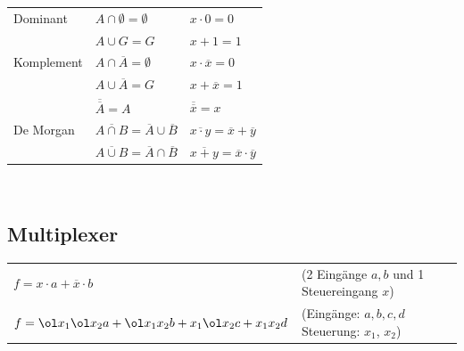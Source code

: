 \documentclass[6pt,a4paper]{scrartcl}
\begin{document}
\begin{multicols}{3}
\begin{tabular}{l|l|l}
		Dominant		& $A \cap \emptyset = \emptyset$ & $x \cdot 0 = 0$ \\
						& $A \cup G = G$ & $x + 1 = 1$ \\
		Komplement		& $A \cap \overline{A} = \emptyset$ & $x \cdot \overline{x} = 0$\\
						& $A \cup \overline{A} = G$ & $x + \overline{x} = 1$\\
						& $\overline{\overline{A}} = A$ & $\overline{\overline{x}} = x$\\
		De Morgan		& $\overline{A \cap B} = \overline{A} \cup \overline{B}$ & $\overline{x \cdot y} = \overline{x} + \overline{y}$\\
						& $\overline{A \cup B} = \overline{A} \cap \overline{B}$ & $\overline{x + y} = \overline{x} \cdot \overline{y}$\\

	\end{tabular}
	\\
	
	
	\subsection{Multiplexer}
	\begin{tabular}{ll}
		$f = x \cdot a + \overline x \cdot b$ & (2 Eingänge $a,b$ und 1 Steuereingang $x$)\\
		$f = \ol x_1 \ol x_2 a + \ol x_1 x_2 b + x_1  \ol x_2 c + x_1 x_2d$ & (Eingänge: $a,b,c,d$  Steuerung: $x_1$, $x_2$)\\
	\end{tabular}




\end{multicols}
\end{document}
